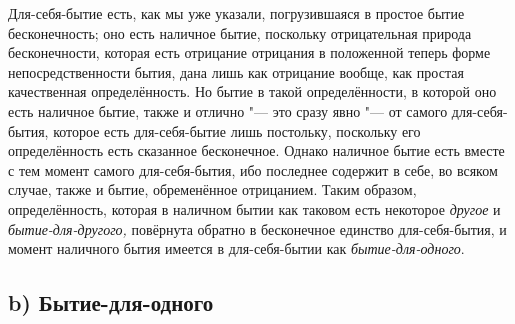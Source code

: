 Для-себя-бытие есть, как мы уже указали, погрузившаяся в простое бытие
бесконечность; оно есть наличное бытие, поскольку отрицательная природа
бесконечности, которая есть отрицание отрицания в положенной теперь форме
непосредственности бытия, дана лишь как отрицание вообще, как простая
качественная определённость. Но бытие в такой определённости, в которой оно
есть наличное бытие, также и отлично "--- это сразу явно "--- от самого
для-себя-бытия, которое есть для-себя-бытие лишь постольку, поскольку его
определённость есть сказанное бесконечное. Однако наличное бытие есть
вместе с тем момент самого для-себя-бытия, ибо последнее содержит в себе,
во всяком случае, также и бытие, обременённое отрицанием. Таким образом,
определённость, которая в наличном бытии как таковом есть некоторое
{\em другое} и {\em бытие-для-другого,} повёрнута обратно в
бесконечное единство для-себя-бытия, и момент наличного бытия имеется в
для-себя-бытии как {\em бытие-для-одного}.

\subsection[b) Бытие-для-одного]{b) Бытие-для-одного}

